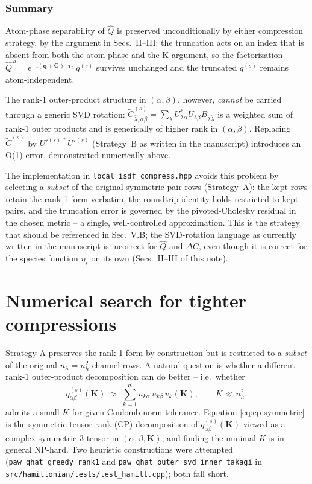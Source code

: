 \documentclass[aps,prb,reprint,superscriptaddress,nofootinbib]{revtex4-2}
\newcommand{\bG}{\mathbf G}
\newcommand{\bq}{\mathbf q}
\newcommand{\btau}{\boldsymbol\tau}
\newcommand{\ee}{\mathrm e}
\newcommand{\ii}{\mathrm i}
\begin{document}
\subsubsection{Summary}

Atom-phase separability of \(\widehat Q\) is preserved unconditionally
by either compression strategy, by the argument in Secs.~II--III: the
truncation acts on an index that is absent from both the atom phase
and the K-argument, so the factorization
\(\widehat Q^{\,a}=\ee^{-\ii(\bq+\bG)\cdot\btau_a}\,q^{(s)}\) survives
unchanged and the truncated \(q^{(s)}\) remains atom-independent.

The rank-1 outer-product structure in \((\alpha,\beta)\), however,
\emph{cannot} be carried through a generic SVD rotation:
\(\widetilde C^{(s)}_{\widetilde\lambda,\alpha\beta}
=\sum_\lambda U^{*}_{\lambda\alpha}U_{\lambda\beta}B_{\lambda\widetilde\lambda}\)
is a weighted sum of rank-1 outer products and is generically of
higher rank in \((\alpha,\beta)\).  Replacing \(\widetilde C^{(s)}\)
by \(U'^{(s)\,*}U'^{(s)}\) (Strategy~B as written in the manuscript)
introduces an O(1) error, demonstrated numerically above.

The implementation in \texttt{local\_isdf\_compress.hpp} avoids this
problem by selecting a \emph{subset} of the original symmetric-pair
rows (Strategy~A): the kept rows retain the rank-1 form verbatim, the
roundtrip identity holds restricted to kept pairs, and the truncation
error is governed by the pivoted-Cholesky residual in the chosen
metric -- a single, well-controlled approximation.  This is the
strategy that should be referenced in Sec.~V.B; the SVD-rotation
language as currently written in the manuscript is incorrect for
\(\widehat Q\) and \(\Delta C\), even though it is correct for the
species function \(\eta_s\) on its own (Secs.~II--III of this note).

\section{Numerical search for tighter compressions}
\label{sec:tighter}

Strategy A preserves the rank-1 form by construction but is restricted
to a \emph{subset} of the original \(n_\lambda=n_h^2\) channel rows.
A natural question is whether a different rank-1 outer-product
decomposition can do better -- i.e.\ whether
\begin{equation}
q^{(s)}_{\alpha\beta}(\mathbf K)\;\approx\;
\sum_{k=1}^{K} u_{k\alpha}\,u_{k\beta}\,v_k(\mathbf K),
\qquad K \ll n_h^2,
\label{eq:cp-symmetric}
\end{equation}
admits a small \(K\) for given Coulomb-norm tolerance.  Equation
\eqref{eq:cp-symmetric} is the symmetric tensor-rank (CP) decomposition
of \(q^{(s)}_{\alpha\beta}(\mathbf K)\) viewed as a complex symmetric
3-tensor in \((\alpha,\beta,\mathbf K)\), and finding the minimal \(K\)
is in general NP-hard.  Two heuristic constructions were attempted
(\texttt{paw\_qhat\_greedy\_rank1} and
\texttt{paw\_qhat\_outer\_svd\_inner\_takagi} in
\texttt{src/hamiltonian/tests/test\_hamilt.cpp}); both fall short.
\end{document}
